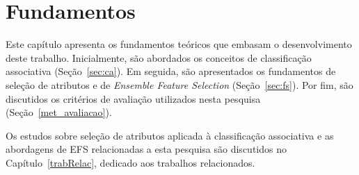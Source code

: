 \chapter{Fundamentos}
\label{cap_fundamentos}

Este capítulo apresenta os fundamentos teóricos que embasam o desenvolvimento deste trabalho. Inicialmente, são abordados os conceitos de classificação associativa (Seção~\ref{sec:ca}). Em seguida, são apresentados os fundamentos de seleção de atributos e de \textit{Ensemble Feature Selection} (Seção~\ref{sec:fs}). Por fim, são discutidos os critérios de avaliação utilizados nesta pesquisa (Seção~\ref{met_avaliacao}).

Os estudos sobre seleção de atributos aplicada à classificação associativa e as abordagens de EFS relacionadas a esta pesquisa são discutidos no Capítulo~\ref{trabRelac}, dedicado aos trabalhos relacionados.

%

%






